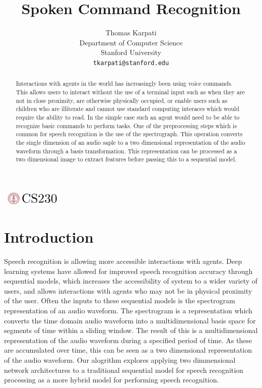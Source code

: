 \documentclass{article}
\title{Spoken Command Recognition}
\author{
  Thomas Karpati \\
  Department of Computer Science\\
  Stanford University\\
  \texttt{tkarpati@stanford.edu} \\
}
\begin{document}

\begin{center}
\includegraphics[width=3cm, height=0.7cm]{CS230}
\end{center}

\maketitle

\begin{abstract}
  Interactions with agents in the world has increasingly been using voice
  commands. This allows users to interact without the use of a
  terminal input such as when they are not in close proximity, are
  otherwise physically occupied, or enable users such as children who
  are illiterate and cannot use standard computing interaces which
  would require the ability to read. In the simple case such an agent
  would need to be able to recognize basic commands to perform
  tasks. One of the preprocessing steps which is common for speech
  recognition is the use of the spectrograph. This operation converts
  the single dimension of an audio saple to a two dimensional
  representation of the audio waveform through a basis
  transformation. This representation can be processed as a two
  dimensional image to extract features before passing this to a
  sequential model. 
\end{abstract}

\section{Introduction}
Speech recognition is allowing more accessible interactions with
agents. Deep learning systems have allowed for improved speech
recognition accuracy through sequential models, which increases the
accessibility of system to a wider variety of users, and allows
interactions with agents who may not be in physical proximity of the
user. Often the inputs to these sequential models is the spectrogram
representation of an audio waveform. The spectrogram is a
representation which converts the time domain audio waveform into a
multidimensional basis space for segments
of time within a sliding window. The result of this is a
multidimensional representation of the audio waveform during a
specified period of time. As these are accumulated over time, this can
be seen as a two dimensional representation of the audio waveform. Our
alogrithm explores applying two dimmensional network architectures to
a traditional sequential model for speech recognition processing as a
more hybrid model for performing speech recognition.
\end{document}
